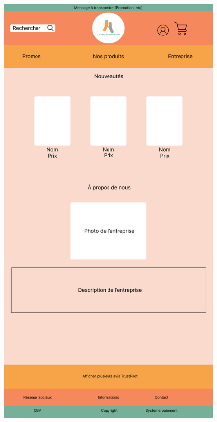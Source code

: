 \documentclass[a4paper, 12pt]{article}
\begin{document}
\begin{figure}[H]
    \centering
    \includegraphics[scale=0.32]{Untitled@2x.png}
\end{figure}
\end{document}
